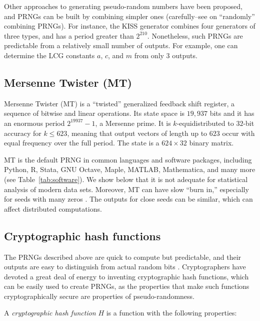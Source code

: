 \documentclass[graybox]{svmult}
\begin{document}
Other approaches to generating pseudo-random numbers have been
proposed, and PRNGs can be built by combining simpler ones (carefully--see \cite{knuth_art_1997} on ``randomly'' combining PRNGs).
For instance, the KISS generator combines four generators of three types, and has a period greater than $2^{210}$.
Nonetheless, such PRNGs are predictable from a relatively small number of outputs.
For example, one can determine the LCG constants $a$, $c$, and $m$ from only 3 outputs.


\subsection{Mersenne Twister (MT)}

Mersenne Twister (MT) \cite{matsumoto_mersenne_1998} is a ``twisted'' generalized feedback shift register, a sequence of bitwise and linear operations.
Its state space is $19,937$ bits and it has an enormous period $2^{19937}-1$, a Mersenne prime.
It is $k$-equidistributed to $32$-bit accuracy for $k \leq 623$, 
meaning that output vectors of length up to $623$ occur with equal frequency over the full period.
The state is a $624 \times 32$ binary matrix.

MT is the default PRNG in common languages and software packages, including Python, R, Stata, GNU Octave, Maple, MATLAB, Mathematica, and many more (see Table~\ref{tab:software}).
We show below that it is not adequate for statistical analysis of modern data sets.
Moreover, MT can have slow ``burn in,'' especially for seeds with many zeros \cite{saito_simd-oriented_2008}.
The outputs for close seeds can be similar, which can affect distributed computations.

\subsection{Cryptographic hash functions}
The PRNGs described above are quick to compute but predictable,
and their outputs are easy to distinguish from actual random bits \cite{lecuyer_testu01_2007}.
Cryptographers have devoted a great deal of energy to inventing cryptographic 
hash functions, which can be easily used to create PRNGs, as the properties that make such functions cryptographically secure
are properties of pseudo-randomness.

A \emph{cryptographic hash function} $H$ is a function with the following properties:
\end{document}
